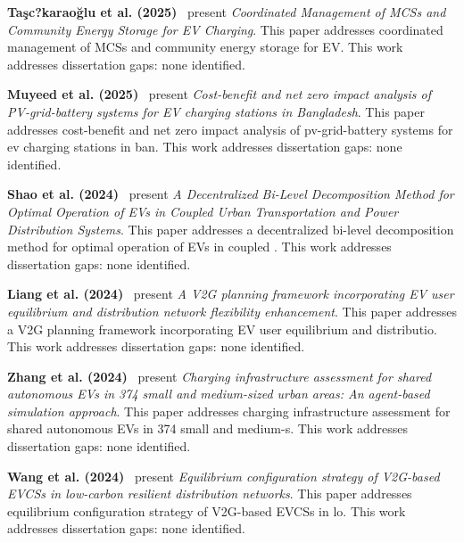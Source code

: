 \documentclass[letterpaper, 12pt, oneside, doublespacing]{Thesis}
\begin{document}
\noindent \textbf{Ta\c{s}c?karao\u{g}lu et al. (2025)}~\cite{coordinated_management_2025} present \textit{Coordinated Management of MCSs and Community Energy Storage for EV Charging}. This paper addresses coordinated management of MCSs and community energy storage for EV. This work addresses dissertation gaps: none identified.



\noindent \textbf{Muyeed et al. (2025)}~\cite{cost-benefit_and_2025} present \textit{Cost-benefit and net zero impact analysis of PV-grid-battery systems for EV charging stations in Bangladesh}. This paper addresses cost-benefit and net zero impact analysis of pv-grid-battery systems for ev charging stations in ban. This work addresses dissertation gaps: none identified.



\noindent \textbf{Shao et al. (2024)}~\cite{a_decentralized_2024} present \textit{A Decentralized Bi-Level Decomposition Method for Optimal Operation of EVs in Coupled Urban Transportation and Power Distribution Systems}. This paper addresses a decentralized bi-level decomposition method for optimal operation of EVs in coupled . This work addresses dissertation gaps: none identified.



\noindent \textbf{Liang et al. (2024)}~\cite{a_vehicle-to-grid_2024} present \textit{A V2G planning framework incorporating EV user equilibrium and distribution network flexibility enhancement}. This paper addresses a V2G planning framework incorporating EV user equilibrium and distributio. This work addresses dissertation gaps: none identified.



\noindent \textbf{Zhang et al. (2024)}~\cite{a_multi-objective_2024} present \textit{Charging infrastructure assessment for shared autonomous EVs in 374 small and medium-sized urban areas: An agent-based simulation approach}. This paper addresses charging infrastructure assessment for shared autonomous EVs in 374 small and medium-s. This work addresses dissertation gaps: none identified.



\noindent \textbf{Wang et al. (2024)}~\cite{beyond_profit_2024} present \textit{Equilibrium configuration strategy of V2G-based EVCSs in low-carbon resilient distribution networks}. This paper addresses equilibrium configuration strategy of V2G-based EVCSs in lo. This work addresses dissertation gaps: none identified.
\end{document}
